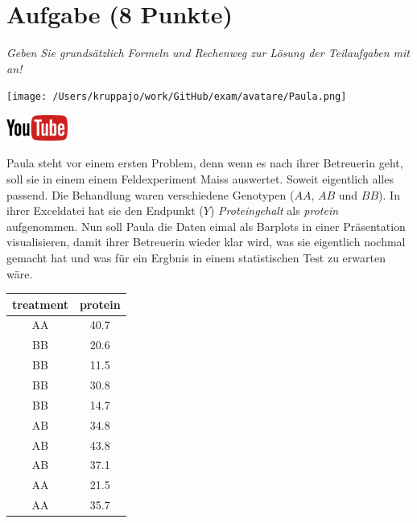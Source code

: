 \documentclass[a4paper, 9pt]{scrartcl}\usepackage[]{graphicx}\usepackage[]{xcolor}
\begin{document}
\section{Aufgabe \hfill (8 Punkte)}

\textit{Geben Sie grundsätzlich Formeln und Rechenweg zur Lösung der Teilaufgaben mit an!} \\[1Ex]
 

 
\begin{minipage}[t]{0.5\textwidth}
\texttt{[image: /Users/kruppajo/work/GitHub/exam/avatare/Paula.png]}
\end{minipage}
\begin{minipage}[t]{0.5\textwidth}
\hfill
\href{https://youtu.be/vXnLttRL_VI}{\includegraphics[width = 2cm]{img/youtube}}\\[1Ex]
\end{minipage}
\vspace{1ex}



Paula steht vor einem ersten Problem, denn wenn es nach ihrer Betreuerin geht, soll sie in einem einem Feldexperiment Maiss auswertet. Soweit eigentlich alles passend. Die Behandlung waren verschiedene Genotypen ($AA$, $AB$ und $BB$). In ihrer Exceldatei hat sie den Endpunkt ($Y$) \textit{Proteingehalt} als \textit{protein} aufgenommen. Nun soll Paula die Daten eimal als Barplots in einer Präsentation visualisieren, damit ihrer Betreuerin wieder klar wird, was sie eigentlich nochmal gemacht hat und was für ein Ergbnis in einem statistischen Test zu erwarten wäre.

\begin{table}[!h]
\centering
\begin{tabular}{cc}
\toprule
treatment & protein\\
\midrule
AA & 40.7\\
BB & 20.6\\
BB & 11.5\\
BB & 30.8\\
BB & 14.7\\
\addlinespace
AB & 34.8\\
AB & 43.8\\
AB & 37.1\\
AA & 21.5\\
AA & 35.7\\
\bottomrule
\end{tabular}
\end{table}
\end{document}

